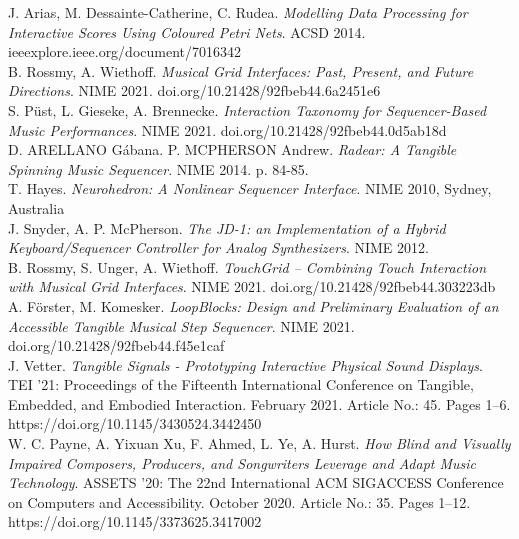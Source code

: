 \documentclass[journal,onecolumn]{IEEEtran}
\begin{document}
\begin{thebibliography}{1}
J. Arias, M. Dessainte-Catherine, C. Rudea. \emph{Modelling Data Processing for Interactive Scores Using Coloured Petri Nets}. ACSD 2014. ieeexplore.ieee.org/document/7016342 \\

B. Rossmy, A. Wiethoff. \emph{Musical Grid Interfaces: Past, Present, and Future Directions}. NIME 2021. doi.org/10.21428/92fbeb44.6a2451e6 \\

S. Püst, L. Gieseke, A. Brennecke. \emph{Interaction Taxonomy for Sequencer-Based Music Performances}. NIME 2021. doi.org/10.21428/92fbeb44.0d5ab18d \\

D. ARELLANO Gábana. P. MCPHERSON Andrew. \emph{Radear: A Tangible Spinning Music Sequencer}. NIME 2014. p. 84-85. \\

T. Hayes. \emph{Neurohedron: A Nonlinear Sequencer Interface}. NIME 2010, Sydney, Australia \\

J. Snyder, A. P. McPherson. \emph{The JD-1: an Implementation of a Hybrid Keyboard/Sequencer Controller for Analog Synthesizers}. NIME 2012. \\

B. Rossmy, S. Unger, A. Wiethoff. \emph{TouchGrid – Combining Touch Interaction with Musical Grid Interfaces}. NIME 2021. doi.org/10.21428/92fbeb44.303223db \\

A. Förster, M. Komesker. \emph{LoopBlocks: Design and Preliminary Evaluation of an Accessible Tangible Musical Step Sequencer}. NIME 2021. doi.org/10.21428/92fbeb44.f45e1caf \\

J. Vetter. \emph{Tangible Signals - Prototyping Interactive Physical Sound Displays}. TEI '21: Proceedings of the Fifteenth International Conference on Tangible, Embedded, and Embodied Interaction. February 2021. Article No.: 45. Pages 1–6. https://doi.org/10.1145/3430524.3442450 \\

W. C. Payne, A. Yixuan Xu, F. Ahmed, L. Ye, A. Hurst. \emph{How Blind and Visually Impaired Composers, Producers, and Songwriters Leverage and Adapt Music Technology}. ASSETS '20: The 22nd International ACM SIGACCESS Conference on Computers and Accessibility. October 2020. Article No.: 35. Pages 1–12. https://doi.org/10.1145/3373625.3417002 \\


\end{thebibliography}
\end{document}
